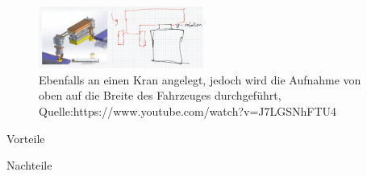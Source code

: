 \paragraph{}
\begin{figure}
        \centering
        \includegraphics[width=0.48\textwidth]{img/technologierecherche/Rotation/seitlich_mit_rotation.jpg}
        \caption{Ebenfalls an einen Kran angelegt, jedoch wird die Aufnahme von oben auf die Breite des Fahrzeuges durchgeführt, Quelle:https://www.youtube.com/watch?v=J7LGSNhFTU4} 
        \label{img:tech_seitlich_mit_rotation}
\end{figure}
\begin{minipage}[t]{0.48\textwidth}
    \begin{items}
          \item [Vorteile]
          \item 
          \item 
    \end{items}
\end{minipage}
\hfill
\begin{minipage}[t]{0.48\textwidth}
    \begin{items}
          \item [Nachteile]
          \item 
          \item
          \item 
          \item 
    \end{items}
\end{minipage}
